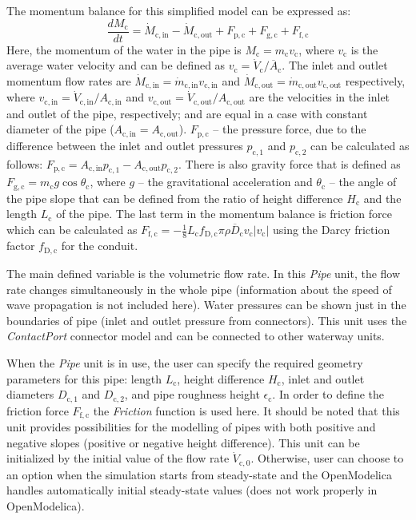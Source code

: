 \documentclass[%
]{USN-PhD}
\begin{document}
The momentum balance for this simplified model can be expressed as:
\begin{equation}\label{eq:eq18}
\frac{dM_\mathrm{c}}{dt} = \dot{M}_\mathrm{c,in} - \dot{M}_\mathrm{c,out} + F_\mathrm{p,c} + F_\mathrm{g,c} + F_\mathrm{f,c}
\end{equation}
Here, the momentum of the water in the pipe is $M_\mathrm{c}=m_\mathrm{c}v_\mathrm{c}$, where $v_\mathrm{c}$ is the average water velocity and can be defined as $v_\mathrm{c}=\dot{V}_\mathrm{c}/\overline{A}_\mathrm{c}$. The inlet and outlet momentum flow rates are $\dot{M}_\mathrm{c,in}=\dot{m}_\mathrm{c,in}v_\mathrm{c,in}$ and $\dot{M}_\mathrm{c,out}=\dot{m}_\mathrm{c,out}v_\mathrm{c,out}$ respectively, where $v_\mathrm{c,in}=\dot{V}_\mathrm{c,in}/A_\mathrm{c,in}$ and $v_\mathrm{c,out}=\dot{V}_\mathrm{c,out}/A_\mathrm{c,out}$ are the velocities in the inlet and outlet of the pipe, respectively; and are equal in a case with constant diameter of the pipe ($A_\mathrm{c,in}=A_\mathrm{c,out}$). $F_\mathrm{p,c}$ -- the pressure force, due to the difference between the inlet and outlet pressures $p_\mathrm{c,1}$ and $p_\mathrm{c,2}$ can be calculated as follows: $F_\mathrm{p,c}=A_\mathrm{c,in}p_\mathrm{c,1}-A_\mathrm{c,out}p_\mathrm{c,2}$. There is also gravity force that is defined as $F_\mathrm{g,c}=m_\mathrm{c}g\cos\theta_\mathrm{c}$, where $g$ -- the gravitational acceleration and $\theta_\mathrm{c}$ -- the angle of the pipe slope that can be defined from the ratio of height difference $H_\mathrm{c}$ and the length $L_\mathrm{c}$ of the pipe. The last term in the momentum balance is friction force which can be calculated as $F_\mathrm{f,c}=-\frac{1}{8}L_\mathrm{c}f_\mathrm{D,c}\pi\rho\overline{D}_\mathrm{c}v_\mathrm{c}|v_\mathrm{c}|$ using the Darcy friction factor $f_\mathrm{D,c}$ for the conduit.

The main defined variable is the volumetric flow rate. In this \emph{Pipe} unit, the flow rate changes simultaneously in the whole pipe (information about the speed of wave propagation is not included here). Water pressures can be shown just in the boundaries of pipe (inlet and outlet pressure from connectors). This unit uses the \emph{ContactPort} connector model and can be connected to other waterway units.

When the \emph{Pipe} unit is in use, the user can specify the required geometry parameters for this pipe: length $L_\mathrm{c}$, height difference $H_\mathrm{c}$, inlet and outlet diameters $D_\mathrm{c,1}$ and $D_\mathrm{c,2}$, and pipe roughness height $\epsilon_\mathrm{c}$. In order to define the friction force $F_\mathrm{f,c}$ the \emph{Friction} function is used here. It should be noted that this unit provides possibilities for the modelling of pipes with both positive and negative slopes (positive or negative height difference). This unit can be initialized by the initial value of the flow rate $\dot{V}_\mathrm{c,0}$. Otherwise, user can choose to an option when the simulation starts from steady-state and the OpenModelica handles automatically initial steady-state values (does not work properly in OpenModelica).
\end{document}
